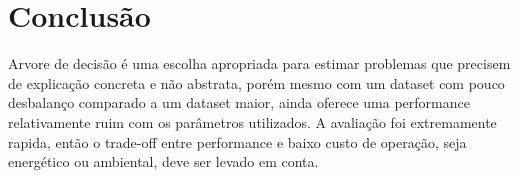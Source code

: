 \documentclass[12pt]{article}
\begin{document}
\section{Conclusão}
Arvore de decisão é uma escolha apropriada para estimar problemas que precisem de explicação concreta e não abstrata, porém mesmo com um dataset com pouco desbalanço comparado a um dataset maior, ainda oferece uma performance relativamente ruim com os parâmetros utilizados. A avaliação foi extremamente rapida, então o trade-off entre performance e baixo custo de operação, seja energético ou ambiental, deve ser levado em conta.



\end{document}
